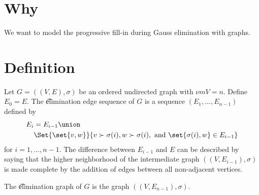
\section*{Why}

We want to model the progressive fill-in during Gauss elimination with graphs.

\section*{Definition}

Let $G = ((V, E), \sigma )$ be an ordered undirected graph with $\nu m{V} = n$.
Define $E_0 = E$.
The \t{elimination edge sequence} of $G$ is a sequence $(E_1, \dots , E_{n-1})$ defined by
\[
\begin{aligned}
E_i & = E_{i-1} \union \\ &\Set{\set{v, w}}{v \succ \sigma (i), w \succ \sigma (i), \text{ and } \set{\sigma (i), w} \in E_{i-1}}
\end{aligned}
\]
for $i = 1, \dots , n-1$.
The difference between $E_{i-1}$ and $E$ can be described by saying that the higher neighborhood of the intermediate graph $((V, E_{i-1}), \sigma )$ is made complete by the addition of edges between all non-adjacent vertices.

The \t{elimination graph} of $G$ is the graph $((V, E_{n-1}), \sigma )$.

\blankpage